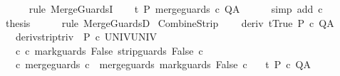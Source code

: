 \begin{isabellebody}
\ \ \ \ \isamarkupfalse%
\ {\isacharparenleft}rule\ MergeGuardsI{\isacharparenright}\isanewline
\ \ \isamarkupfalse%
\ {\isachardoublequoteopen}{\isasymGamma}{\isacharcomma}{\isasymTheta}{\isasymturnstile}\isactrlsub t\isactrlbsub {\isacharslash}{\isacharbraceleft}{\isacharbraceright}\isactrlesub \ P\ merge{\isacharunderscore}guards\ c\ Q{\isacharcomma}A{\isachardoublequoteclose}\isanewline
\ \ \ \ \isamarkupfalse%
\ {\isacharparenleft}simp\ add{\isacharcolon}\ c{\isacharparenright}\isanewline
\ \ \isamarkupfalse%
\ {\isacharquery}thesis\isanewline
\ \ \ \ \isamarkupfalse%
\ {\isacharparenleft}rule\ MergeGuardsD{\isacharparenright}\isanewline
{}\isamarkupfalse%
%
\endisatagproof
{\isafoldproof}%
%
\isadelimproof
\isanewline
%
\endisadelimproof
\isanewline
{}\isamarkupfalse%
\ CombineStrip{\isacharprime}{\isacharprime}{\isacharcolon}\ \isanewline
\ \ \ deriv{\isacharcolon}\ {\isachardoublequoteopen}{\isasymGamma}{\isacharcomma}{\isasymTheta}{\isasymturnstile}\isactrlsub t\isactrlbsub {\isacharslash}{\isacharbraceleft}True{\isacharbraceright}\isactrlesub \ P\ c{\isacharprime}\ Q{\isacharcomma}A{\isachardoublequoteclose}\isanewline
\ \ \ deriv{\isacharunderscore}strip{\isacharunderscore}triv{\isacharcolon}\ {\isachardoublequoteopen}{\isasymGamma}{\isacharcomma}{\isacharbraceleft}{\isacharbraceright}{\isasymturnstile}\isactrlbsub {\isacharslash}{\isacharbraceleft}{\isacharbraceright}\isactrlesub \ P\ c{\isacharprime}{\isacharprime}\ UNIV{\isacharcomma}UNIV{\isachardoublequoteclose}\isanewline
\ \ \ c{\isacharprime}{\isacharprime}{\isacharcolon}\ {\isachardoublequoteopen}c{\isacharprime}{\isacharprime}{\isacharequal}\ mark{\isacharunderscore}guards\ False\ {\isacharparenleft}strip{\isacharunderscore}guards\ {\isacharparenleft}{\isacharbraceleft}False{\isacharbraceright}{\isacharparenright}\ c{\isacharprime}{\isacharparenright}{\isachardoublequoteclose}\isanewline
\ \ \ c{\isacharcolon}\ {\isachardoublequoteopen}merge{\isacharunderscore}guards\ c\ {\isacharequal}\ merge{\isacharunderscore}guards\ {\isacharparenleft}mark{\isacharunderscore}guards\ False\ c{\isacharprime}{\isacharparenright}{\isachardoublequoteclose}\isanewline
\ \ \ {\isachardoublequoteopen}{\isasymGamma}{\isacharcomma}{\isasymTheta}{\isasymturnstile}\isactrlsub t\isactrlbsub {\isacharslash}{\isacharbraceleft}{\isacharbraceright}\isactrlesub \ P\ c\ Q{\isacharcomma}A{\isachardoublequoteclose}\isanewline

\end{isabellebody}
